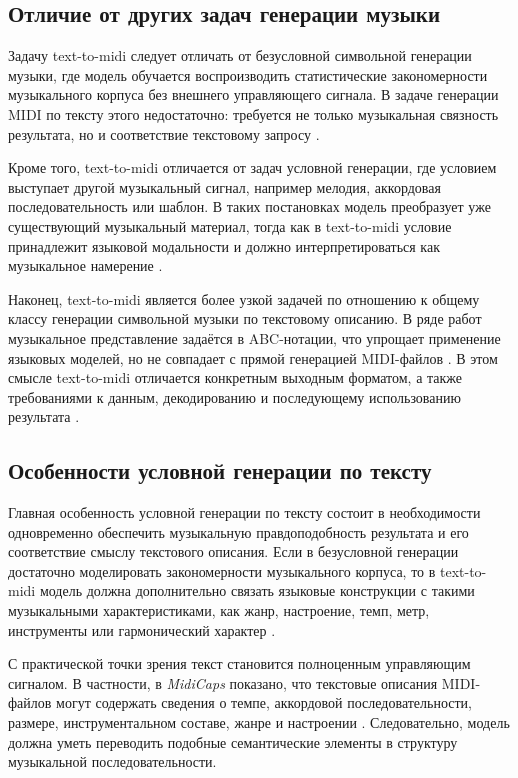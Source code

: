 \documentclass[a4paper,12pt]{extarticle}
\begin{document}
\subsection{Отличие от других задач генерации музыки}

Задачу text-to-midi следует отличать от безусловной символьной
генерации музыки, где модель обучается воспроизводить статистические
закономерности музыкального корпуса без внешнего управляющего сигнала. В
задаче генерации MIDI по тексту этого недостаточно: требуется не только
музыкальная связность результата, но и соответствие текстовому запросу
\cite{wu2022texttomusic,lu2023musecoco}.

Кроме того, text-to-midi отличается от задач условной генерации, где
условием выступает другой музыкальный сигнал, например мелодия,
аккордовая последовательность или шаблон. В таких постановках модель
преобразует уже существующий музыкальный материал, тогда как в
text-to-midi условие принадлежит языковой модальности и должно
интерпретироваться как музыкальное намерение
\cite{ju2022telemelody,lu2023musecoco}.

Наконец, text-to-midi является более узкой задачей по отношению к
общему классу генерации символьной музыки по текстовому описанию. В
ряде работ музыкальное представление задаётся в ABC-нотации, что
упрощает применение языковых моделей, но не совпадает с прямой
генерацией MIDI-файлов \cite{wu2022texttomusic,yuan2024chatmusician}. В
этом смысле text-to-midi отличается конкретным выходным форматом, а
также требованиями к данным, декодированию и последующему использованию
результата \cite{melechovsky2024midicaps,bhandari2025text2midi}.

\subsection{Особенности условной генерации по тексту}

Главная особенность условной генерации по тексту состоит в необходимости
одновременно обеспечить музыкальную правдоподобность результата и его
соответствие смыслу текстового описания. Если в безусловной генерации
достаточно моделировать закономерности музыкального корпуса, то в
text-to-midi модель должна дополнительно связать языковые конструкции с
такими музыкальными характеристиками, как жанр, настроение, темп, метр,
инструменты или гармонический характер
\cite{lu2023musecoco,melechovsky2024midicaps,bhandari2025text2midi}.

С практической точки зрения текст становится полноценным управляющим
сигналом. В частности, в \textit{MidiCaps} показано, что текстовые
описания MIDI-файлов могут содержать сведения о темпе, аккордовой
последовательности, размере, инструментальном составе, жанре и
настроении \cite{melechovsky2024midicaps}. Следовательно, модель должна
уметь переводить подобные семантические элементы в структуру музыкальной
последовательности.
\end{document}
